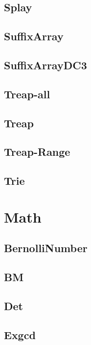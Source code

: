 \documentclass{article}
\begin{document}
\subsection{Splay}

\subsection{SuffixArray}

\subsection{SuffixArrayDC3}

\subsection{Treap-all}

\subsection{Treap}

\subsection{Treap-Range}

\subsection{Trie}

\section{Math}
\subsection{BernolliNumber}

\subsection{BM}

\subsection{Det}

\subsection{Exgcd}

\end{document}
